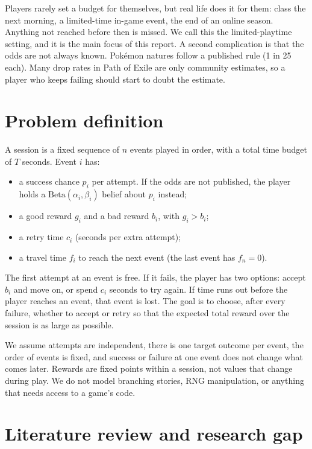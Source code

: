 \documentclass[11pt,a4paper]{article}
\newcommand{\who}[1]{}
\begin{document}
Players rarely set a budget for themselves, but real life does it for them: class the next morning, a limited-time in-game event, the end of an online season. Anything not reached before then is missed. We call this the limited-playtime setting, and it is the main focus of this report. A second complication is that the odds are not always known. Pok\'emon natures follow a published rule (1 in 25 each). Many drop rates in Path of Exile are only community estimates, so a player who keeps failing should start to doubt the estimate.

\section{Problem definition\who{Daniel}}
A session is a fixed sequence of $n$ events played in order, with a total time budget of $T$ seconds. Event $i$ has:
\begin{itemize}
\item a success chance $p_i$ per attempt. If the odds are not published, the player holds a $\mathrm{Beta}(\alpha_i, \beta_i)$ belief about $p_i$ instead;
\item a good reward $g_i$ and a bad reward $b_i$, with $g_i > b_i$;
\item a retry time $c_i$ (seconds per extra attempt);
\item a travel time $f_i$ to reach the next event (the last event has $f_n = 0$).
\end{itemize}

The first attempt at an event is free. If it fails, the player has two options: accept $b_i$ and move on, or spend $c_i$ seconds to try again. If time runs out before the player reaches an event, that event is lost. The goal is to choose, after every failure, whether to accept or retry so that the expected total reward over the session is as large as possible.

We assume attempts are independent, there is one target outcome per event, the order of events is fixed, and success or failure at one event does not change what comes later. Rewards are fixed points within a session, not values that change during play. We do not model branching stories, RNG manipulation, or anything that needs access to a game's code.

\section{Literature review and research gap\who{Vivian}}
\end{document}

